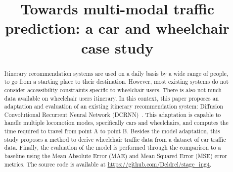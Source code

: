 \documentclass[conference]{IEEEtran}
\begin{document}



    \title{Towards multi-modal traffic prediction: a car and wheelchair case study}
    \author{\IEEEauthorblockN{[Anonymous]}}

    \maketitle

    \begin{abstract}
        Itinerary recommendation systems are used on a daily basis by a wide range of people, to go from a starting place to their destination.
        However, most existing systems do not consider accessibility constraints specific to wheelchair users.
        There is also not much data available on wheelchair users itinerary.
        In this context, this paper proposes an adaptation and evaluation of an existing itinerary recommendation system: Diffusion Convolutional Recurrent Neural Network (DCRNN)~\cite{DCRNN}.
        This adaptation is capable to handle multiple locomotion modes, specifically cars and wheelchairs, and computes the time required to travel from point A to point B.
        Besides the model adaptation, this study proposes a method to derive wheelchair traffic data from a dataset of car traffic data.
        Finally, the evaluation of the model is performed through the comparison to a baseline using the Mean Absolute Error (MAE) and Mean Squared Error (MSE) error metrics.
        The source code is available at \url{https://github.com/Deldrel/stage_ing4}.
    \end{abstract}
\end{document}
